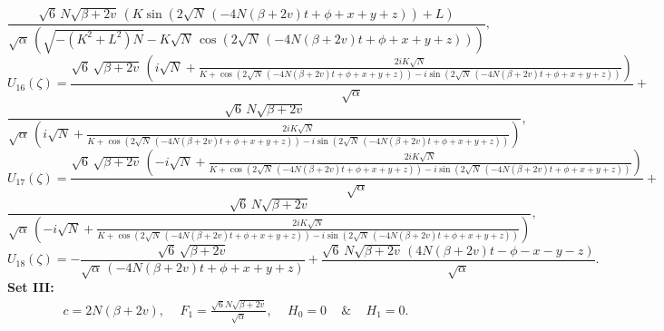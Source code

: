 \documentclass{article}
\numberwithin{equation}{section}
\begin{document}
\begin{equation}
\frac{\sqrt{6}\, N \sqrt{\beta +2 v}\, \left(K \sin \! \left(2 \sqrt{N}\, \left(-4 N \left(\beta +2 v \right) t +\phi +x +y +z \right)\right)+L \right)}{\sqrt{\alpha}\, \left(\sqrt{-\left(K^{2}+L^{2}\right) N}-K \sqrt{N}\, \cos \! \left(2 \sqrt{N}\, \left(-4 N \left(\beta +2 v \right) t +\phi +x +y +z \right)\right)\right)},
\end{equation}
\begin{equation}\label{U16}
    U_{16}\! \left(\zeta \right) =
\frac{\sqrt{6}\, \sqrt{\beta +2 v}\, \left(i \sqrt{N}+\frac{2 i K \sqrt{N}}{K +\cos \left(2 \sqrt{N}\, \left(-4 N \left(\beta +2 v \right) t +\phi +x +y +z \right)\right)-i \sin \left(2 \sqrt{N}\, \left(-4 N \left(\beta +2 v \right) t +\phi +x +y +z \right)\right)}\right)}{\sqrt{\alpha}}+\nonumber
\end{equation}
\begin{equation}
\frac{\sqrt{6}\, N \sqrt{\beta +2 v}}{\sqrt{\alpha}\, \left(i \sqrt{N}+\frac{2 i K \sqrt{N}}{K +\cos \left(2 \sqrt{N}\, \left(-4 N \left(\beta +2 v \right) t +\phi +x +y +z \right)\right)-i \sin \left(2 \sqrt{N}\, \left(-4 N \left(\beta +2 v \right) t +\phi +x +y +z \right)\right)}\right)},
\end{equation}
\begin{equation}\label{U17}
    U_{17}\! \left(\zeta \right) =
\frac{\sqrt{6}\, \sqrt{\beta +2 v}\, \left(-i \sqrt{N}+\frac{2 i K \sqrt{N}}{K +\cos \left(2 \sqrt{N}\, \left(-4 N \left(\beta +2 v \right) t +\phi +x +y +z \right)\right)-i \sin \left(2 \sqrt{N}\, \left(-4 N \left(\beta +2 v \right) t +\phi +x +y +z \right)\right)}\right)}{\sqrt{\alpha}}+\nonumber
\end{equation}
\begin{equation}
\frac{\sqrt{6}\, N \sqrt{\beta +2 v}}{\sqrt{\alpha}\, \left(-i \sqrt{N}+\frac{2 i K \sqrt{N}}{K +\cos \left(2 \sqrt{N}\, \left(-4 N \left(\beta +2 v \right) t +\phi +x +y +z \right)\right)-i \sin \left(2 \sqrt{N}\, \left(-4 N \left(\beta +2 v \right) t +\phi +x +y +z \right)\right)}\right)},
\end{equation}
\begin{equation}\label{U18}
    U_{18}\! \left(\zeta \right) =
-\frac{\sqrt{6}\, \sqrt{\beta +2 v}}{\sqrt{\alpha}\, \left(-4 N \left(\beta +2 v \right) t +\phi +x +y +z \right)}+\frac{\sqrt{6}\, N \sqrt{\beta +2 v}\, \left(4 N \left(\beta +2 v \right) t -\phi -x -y -z \right)}{\sqrt{\alpha}}.
\end{equation}
\textbf{Set III:}
\begin{eqnarray}\label{set3}
c = 2N(\beta+2v),\quad\,F_{1} = \frac{\sqrt{6} N \sqrt{\beta+2v}}{\sqrt{\alpha}},\quad\, H_{0} = 0\quad\,{\&}\quad\,H_{1} = 0.
\end{eqnarray}
\end{document}
